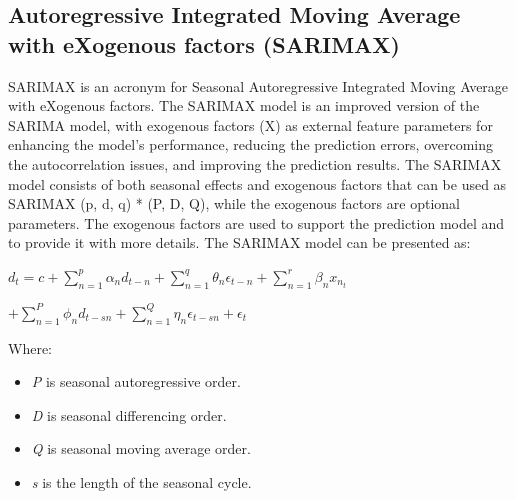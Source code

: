 \documentclass{ieeeojies}
\begin{document}
\subsection{Autoregressive Integrated Moving Average with eXogenous factors (SARIMAX)}
SARIMAX is an acronym for Seasonal Autoregressive Integrated Moving Average with eXogenous factors. The SARIMAX model is an improved version of the SARIMA model, with exogenous factors  (X)  as  external  feature  parameters  for  enhancing  the  model’s  performance, reducing the prediction errors, overcoming the autocorrelation issues, and improving the prediction results. The SARIMAX model consists of both seasonal effects and exogenous factors that can be used as SARIMAX (p, d, q) * (P, D, Q), while the exogenous factors are optional parameters. The exogenous factors are used to support the prediction model and to provide it with more details. The SARIMAX model can be presented as:
\newline \centerline{$d_{t} = c + \displaystyle \sum_{n=1}^{p}\alpha_{n}d_{t-n} + \displaystyle \sum_{n=1}^{q}\theta_{n}\epsilon_{t-n} + \displaystyle \sum_{n=1}^{r}\beta_{n}x_{n_{t}}$}
\newline \centerline{$+ \displaystyle \sum_{n=1}^{P}\phi_{n}d_{t-sn} + \displaystyle \sum_{n=1}^{Q}\eta_{n}\epsilon_{t-sn} + \epsilon_{t}$}
\newline Where:
\begin{itemize}
	\item \textit{P} is seasonal autoregressive order.
	\item \textit{D} is seasonal differencing order.
	\item \textit{Q} is seasonal moving average order.
	\item \textit{s} is the length of the seasonal cycle.
\end{itemize}
\end{document}
